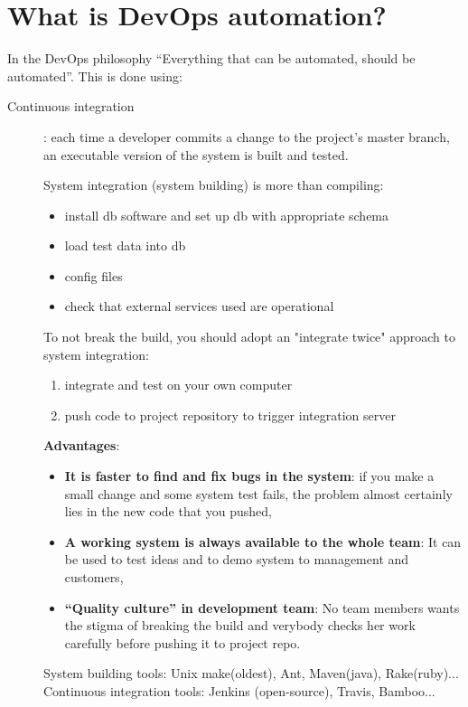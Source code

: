 \section{What is DevOps automation?}
In the DevOps philosophy “Everything that can be automated, should be automated”.
This is done using:
\begin{description}
   \item[Continuous integration]: each time a developer commits a change to the project’s master branch, an executable version of the system is built and tested.

         System integration (system building) is more than compiling:
         \begin{itemize}
            \item install db software and set up db with appropriate schema
            \item load test data into db
            \item config files
            \item  check that external services used are operational
         \end{itemize}
         To not break the build, you should adopt an "integrate twice" approach to system integration:
         \begin{enumerate}
            \item integrate and test on your own computer
            \item push code to project repository to trigger integration server
         \end{enumerate}
         \textbf{Advantages}:
         \begin{itemize}
            \item \textbf{It is faster to find and fix bugs in the system}: if you make a small change and some system test fails, the problem almost certainly lies in the new code that you pushed,
            \item \textbf{A working system is always available to the whole team}: It can be used to test ideas and to demo system to management and customers,
            \item \textbf{“Quality culture” in development team}: No team members wants the stigma of breaking the build and verybody checks her work carefully before pushing it to project repo.
         \end{itemize}
         System building tools: Unix make(oldest), Ant, Maven(java), Rake(ruby)...
         \nl
         Continuous integration tools: Jenkins (open-source), Travis, Bamboo...

\end{description}
